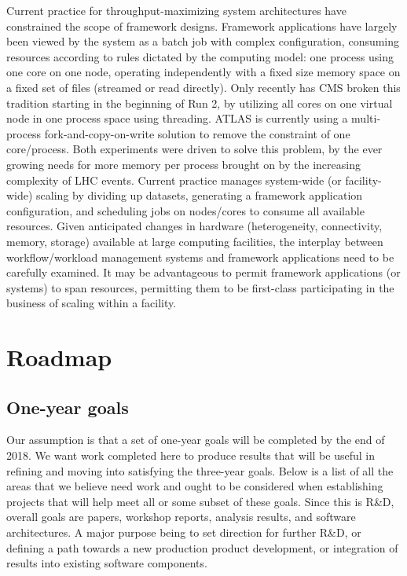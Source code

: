 \documentclass[12pt,a4paper]{article}
\begin{document}
Current practice for throughput-maximizing system architectures have
constrained the scope of framework designs. Framework applications
have largely been viewed by the system as a batch job with complex
configuration, consuming resources according to rules dictated by the
computing model: one process using one core on one node, operating
independently with a fixed size memory space on a fixed set of files
(streamed or read directly). Only recently has CMS broken this
tradition starting in the beginning of Run 2, by utilizing all cores
on one virtual node in one process space using threading. ATLAS is
currently using a multi-process fork-and-copy-on-write solution to
remove the constraint of one core/process. Both experiments were
driven to solve this problem, by the ever growing needs for more
memory per process brought on by the increasing complexity of LHC
events. Current practice manages system-wide (or facility-wide)
scaling by dividing up datasets, generating a framework application
configuration, and scheduling jobs on nodes/cores to consume all
available resources. Given anticipated changes in hardware
(heterogeneity, connectivity, memory, storage) available at large
computing facilities, the interplay between workflow/workload
management systems and framework applications need to be carefully
examined. It may be advantageous to permit framework applications (or
systems) to span resources, permitting them to be first-class
participating in the business of scaling within a facility.

\section{Roadmap}
\label{sec:roadmap}

\subsection{One-year goals}
\label{sec:one-year-goals}

Our assumption is that a set of one-year goals will be completed by
the end of 2018. We want work completed here to produce results that
will be useful in refining and moving into satisfying the three-year
goals.  Below is a list of all the areas that we believe need work and
ought to be considered when establishing projects that will help meet
all or some subset of these goals. Since this is R\&D, overall goals
are papers, workshop reports, analysis results, and software
architectures. A major purpose being to set direction for further
R\&D, or defining a path towards a new production product development,
or integration of results into existing software components.
\end{document}
